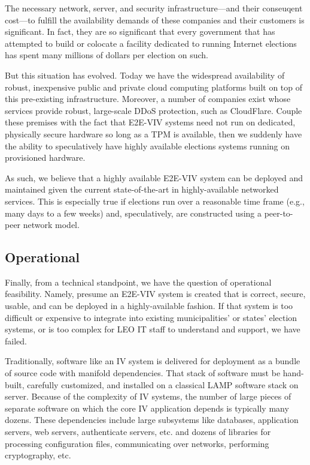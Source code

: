 The necessary network, server, and security infrastructure---and their
conseuqent cost---to fulfill the availability demands of these
companies and their customers is significant. In fact, they are so
significant that every government that has attempted to build or
colocate a facility dedicated to running Internet elections has spent
many millions of dollars per election on such.

But this situation has evolved. Today we have the widespread
availability of robust, inexpensive public and private cloud computing
platforms built on top of this pre-existing infrastructure. Moreover,
a number of companies exist whose services provide robust, large-scale
DDoS protection, such as CloudFlare. Couple these premises with the
fact that E2E-VIV systems need not run on dedicated, physically secure
hardware so long as a TPM is available, then we suddenly have the
ability to speculatively have highly available elections systems
running on provisioned hardware. 

As such, we believe that a highly available E2E-VIV system can be
deployed and maintained given the current state-of-the-art in
highly-available networked services. This is especially true if
elections run over a reasonable time frame (e.g., many days to a few
weeks) and, speculatively, are constructed using a peer-to-peer
network model.

\subsection{Operational}

Finally, from a technical standpoint, we have the question of
operational feasibility.  Namely, presume an E2E-VIV system is created
that is correct, secure, usable, and can be deployed in a
highly-available fashion. If that system is too difficult or expensive
to integrate into existing municipalities' or states' election
systems, or is too complex for LEO IT staff to understand and support,
we have failed.

Traditionally, software like an IV system is delivered for deployment
as a bundle of source code with manifold dependencies. That stack of
software must be hand-built, carefully customized, and installed on a
classical LAMP software stack on server.  Because of the complexity of
IV systems, the number of large pieces of separate software on which
the core IV application depends is typically many dozens.  These
dependencies include large subsystems like databases, application
servers, web servers, authenticate servers, etc. and dozens of
libraries for processing configuration files, communicating over
networks, performing cryptography, etc.

